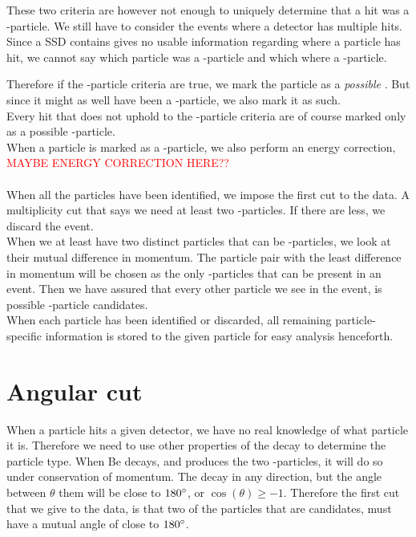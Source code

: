 These two criteria are however not enough to uniquely determine that a hit was a \be-particle. We still have to consider the events where a detector has multiple hits. Since a SSD contains gives no usable information regarding where a particle has hit, we cannot say which particle was a \be-particle and which where a \al-particle. 

Therefore if the \be-particle criteria are true, we mark the particle as a \textit{possible} \be. But since it might as well have been a \al-particle, we also mark it as such.\\
Every hit that does not uphold to the \be-particle criteria are of course marked only as a possible \al-particle.
\\
When a particle is marked as a \al-particle, we also perform an energy correction, \textcolor{red}{MAYBE ENERGY CORRECTION HERE??}
\\
\\
When all the particles have been identified, we impose the first cut to the data. A multiplicity cut that says we need at least two \al-particles. If there are less, we discard the event. 
\\
When we at least have two distinct particles that can be \al-particles, we look at their mutual difference in momentum. The particle pair with the least difference in momentum will be chosen as the only \al-particles that can be present in an event. Then we have assured that every other particle we see in the event, is possible \be-particle candidates. 
\\
When each particle has been identified or discarded, all remaining particle-specific information is stored to the given particle for easy analysis henceforth.





\section{Angular cut}
When a particle hits a given detector, we have no real knowledge of what particle it is. 
Therefore we need to use other properties of the decay to determine the particle type. 
When \isotope[8][]Be decays, and produces the two \al-particles, it will do so under conservation of momentum. The decay in any direction, but the angle between $\theta$ them will be close to  $180\degree$, or $\cos(\theta) \geq -1$. Therefore the first cut that we give to the data, is that two of the particles that are \al candidates, must have a mutual angle of close to $180\degree$.\\


